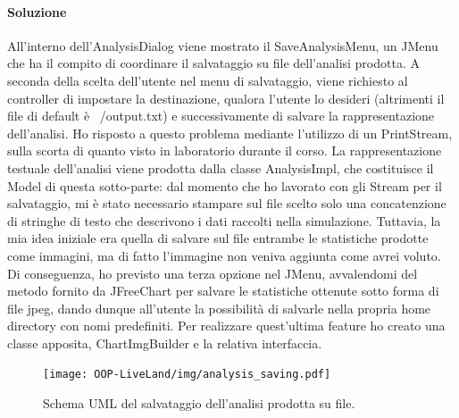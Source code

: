 \documentclass[a4paper,12pt]{report}
\begin{document}
\paragraph{Soluzione} All’interno dell’AnalysisDialog viene mostrato il SaveAnalysisMenu, un JMenu che ha il compito di coordinare il salvataggio su file dell’analisi prodotta. A seconda della scelta dell’utente nel menu di salvataggio, viene richiesto al controller di impostare la destinazione, qualora l’utente lo desideri (altrimenti il file di default è ~/output.txt) e successivamente di salvare la rappresentazione dell’analisi. Ho risposto a questo problema mediante l’utilizzo di un PrintStream, sulla scorta di quanto visto in laboratorio durante il corso. La rappresentazione testuale dell’analisi viene prodotta dalla classe AnalysisImpl, che costituisce il Model di questa sotto-parte: dal momento che ho lavorato con gli Stream per il salvataggio, mi è stato necessario stampare sul file scelto solo una concatenzione di stringhe di testo che descrivono i dati raccolti nella simulazione. Tuttavia, la mia idea iniziale era quella di salvare sul file entrambe le statistiche prodotte come immagini, ma di fatto l’immagine non veniva aggiunta come avrei voluto. Di conseguenza, ho previsto una terza opzione nel JMenu, avvalendomi del metodo fornito da JFreeChart per salvare le statistiche ottenute sotto forma di file jpeg, dando dunque all’utente la possibilità di salvarle nella propria home directory con nomi predefiniti. Per realizzare quest’ultima feature ho creato una classe apposita, ChartImgBuilder e la relativa interfaccia.

\begin{figure}[h]
\centering{}
\texttt{[image: OOP-LiveLand/img/analysis\_saving.pdf]}
\caption{Schema UML del salvataggio dell'analisi prodotta su file.}
\label{img:analysis_saving}
\end{figure}
\end{document}
